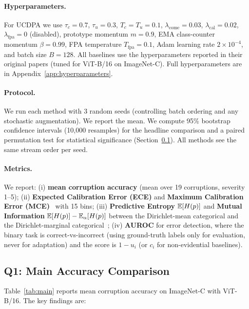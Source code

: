 \paragraph{Hyperparameters.}
For UCDPA we use $\tau_c=0.7$, $\tau_u=0.3$, $T_c=T_u=0.1$, $\lambda_\mathrm{come}=0.03$, $\lambda_\mathrm{cal}=0.02$, $\lambda_\mathrm{fpa}=0$ (disabled), prototype momentum $m=0.9$, EMA class-counter momentum $\beta=0.99$, FPA temperature $T_\mathrm{fpa}=0.1$, Adam learning rate $2\times10^{-4}$, and batch size $B=128$. All baselines use the hyperparameters reported in their original papers (tuned for ViT-B/16 on ImageNet-C). Full hyperparameters are in Appendix~\ref{app:hyperparameters}.

\paragraph{Protocol.}
We run each method with 3 random seeds (controlling batch ordering and any stochastic augmentation). We report the mean. We compute 95\% bootstrap confidence intervals (10{,}000 resamples) for the headline comparison and a paired permutation test for statistical significance (Section~\ref{sec:exp:main}). All methods see the same stream order per seed.

\paragraph{Metrics.}
We report: (i) \textbf{mean corruption accuracy} (mean over 19 corruptions, severity 1--5); (ii) \textbf{Expected Calibration Error (ECE)} and \textbf{Maximum Calibration Error (MCE)}~\citep{guo2017calibration} with 15 bins; (iii) \textbf{Predictive Entropy} $\mathbb{E}[H(p)]$ and \textbf{Mutual Information} $\mathbb{E}[H(p)] - \mathbb{E}_{\alpha}[H(p)]$ between the Dirichlet-mean categorical and the Dirichlet-marginal categorical~\citep{smith2018understanding}; (iv) \textbf{AUROC} for error detection, where the binary task is correct-vs-incorrect (using ground-truth labels only for evaluation, never for adaptation) and the score is $1 - u_i$ (or $c_i$ for non-evidential baselines).

\subsection{Q1: Main Accuracy Comparison}
\label{sec:exp:main}



Table~\ref{tab:main} reports mean corruption accuracy on ImageNet-C with ViT-B/16. The key findings are:

